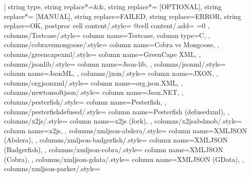 \usepackage{colortbl}
\usepackage{makecell}
\usepackage{booktabs}
\usepackage{threeparttable}
\usepackage{pifont}
\newcommand{\cmark}{\ding{51}}%
\newcommand{\xmark}{\ding{55}}%
\usepackage[T1]{fontenc}
\usepackage{rubfonts2009}

  \begin{threeparttable}
\setlength{\tabcolsep}{1.25mm}
\pgfplotstabletypeset[
    string type,
    string replace*={&}{\&},
    string replace*={ [OPTIONAL]}{},
    string replace*={ [MANUAL]}{},
    string replace={FAILED}{},
    string replace={ERROR}{\xmark},
    string replace={OK}{\cmark},
    postproc cell content/.style={%
        @cell content/.add={
            \ifnum{}=0
                \color{white}
            \fi
           }{}
    },
    columns/Testcase/.style={
        column name=Testcase,
        column type={C},
    },
    columns/cobravsmongoose/.style={
        column name={Cobra vs Mongoose},
    },
    columns/greencapexml/.style={
        column name={GreenCape XML},
    },
    columns/jsonlib/.style={
        column name={Json-lib},
    },
    columns/jsonml/.style={
        column name={JsonML},
    },
    columns/jxon/.style={
        column name={JXON},
    },
    columns/orgjsonxml/.style={
        column name={org.json.XML},
    },
    columns/newtonsoftjson/.style={
        column name={Json.NET},
    },
    columns/pesterfish/.style={
        column name={Pesterfish},
    },
    columns/pesterfishdefused/.style={
        column name={Pesterfish (defusedxml)},
    },
    columns/x2js/.style={
        column name={x2js (fork)},
    },
    columns/x2jsabdmob/.style={
        column name=x2js,
    },
    columns/xmljson-abdera/.style={
        column name=XMLJSON (Abdera),
    },
    columns/xmljson-badgerfish/.style={
        column name=XMLJSON (Badgerfish),
    },
    columns/xmljson-cobra/.style={
        column name=XMLJSON (Cobra),
    },
    columns/xmljson-gdata/.style={
        column name=XMLJSON (GData),
    },
    columns/xmljson-parker/.style={
}
\end{threeparttable}
